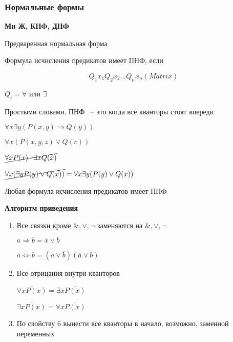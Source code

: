 \documentclass[russian]{lecture-notes}
\begin{document}
    \subsubsection{Нормальные формы}

    \textbf{Мн Ж, КНФ, ДНФ}

    \begin{definition}
        Предваренная нормальная форма

        Формула исчисления предикатов имеет ПНФ, если

        $$Q_1 x_1 Q_2 x_2 \dots Q_n x_n (  Matrix  )$$

        $Q_i = \forall$ или $\exists$

        Простыми словами, ПНФ ~-- это когда все кванторы стоят впереди
    \end{definition}

    \begin{example}
        $\forall x \exists y (P(x, y) \Rightarrow Q(y))$
    \end{example}

    \begin{example}
        $\forall x (P(x, y, z) \lor Q(c))$
    \end{example}

    \begin{example}
        $\cancel{\forall x P(x) \cdot \exists x Q(x)}$
    \end{example}

    \begin{example}
        $\cancel{\forall x (\exists y P(y) \lor Q(x))}  = \forall x \exists y (P(y) \lor Q(x))$
    \end{example}


    \begin{theorem}
        Любая формула исчисления предикатов имеет ПНФ
    \end{theorem}

    \textbf{Алгоритм приведения}

    \begin{enumerate}
        \item{
            Все связки кроме $\&, \lor, \neg$ заменяются на $\&, \lor, \neg$

            $a \Rightarrow b = \overline{x} \lor b$

            $a \Leftrightarrow b = (a \lor \overline{b})(\overline{a} \lor b)$
        }

        \item{
            Все отрицания внутри кванторов

            $\overline{\forall x P(x)} = \exists x \overline{P(x)}$

            $\overline{\exists x P(x)} = \forall x \overline{P(x)}$
        }

        \item{
            По свойству 6 вынести все кванторы в начало, возможно, заменной переменных
        }
    \end{enumerate}
\end{document}

